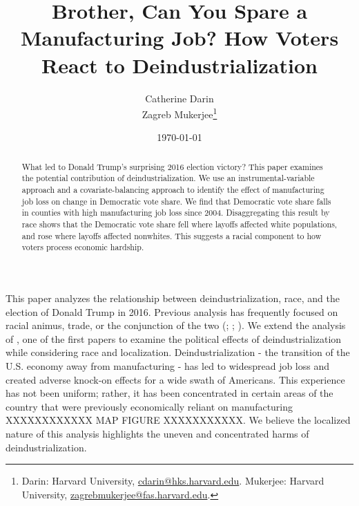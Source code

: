 \documentclass[]{AEA}
\begin{document}
\title{Brother, Can You Spare a Manufacturing Job? How Voters React to
Deindustrialization}


\author{
  Catherine Darin\\
  Zagreb Mukerjee\thanks{
  Darin: Harvard University, \href{mailto:cdarin@hks.harvard.edu}{cdarin@hks.harvard.edu}.
  Mukerjee: Harvard University, \href{mailto:zagrebmukerjee@fas.harvard.edu}{zagrebmukerjee@fas.harvard.edu}.
}
}

\date{\today}
\pubVolume{}
\pubIssue{}
\JEL{}
\Keywords{}

\begin{abstract}
What led to Donald Trump's surprising 2016 election victory? This paper
examines the potential contribution of deindustrialization. We use an
instrumental-variable approach and a covariate-balancing approach to
identify the effect of manufacturing job loss on change in Democratic
vote share. We find that Democratic vote share falls in counties with
high manufacturing job loss since 2004. Disaggregating this result by
race shows that the Democratic vote share fell where layoffs affected
white populations, and rose where layoffs affected nonwhites. This
suggests a racial component to how voters process economic hardship.
\end{abstract}


\maketitle

This paper analyzes the relationship between deindustrialization, race,
and the election of Donald Trump in 2016. Previous analysis has
frequently focused on racial animus, trade, or the conjunction of the
two (\cite{Autor20}; \cite{che16}; \cite{BR21}). We extend the analysis
of \cite{Baccini21}, one of the first papers to examine the political
effects of deindustrialization while considering race and localization.
Deindustrialization - the transition of the U.S. economy away from
manufacturing - has led to widespread job loss and created adverse
knock-on effects for a wide swath of Americans. This experience has not
been uniform; rather, it has been concentrated in certain areas of the
country that were previously economically reliant on manufacturing
XXXXXXXXXXXX MAP FIGURE XXXXXXXXXXX. We believe the localized nature of
this analysis highlights the uneven and concentrated harms of
deindustrialization.
\end{document}

